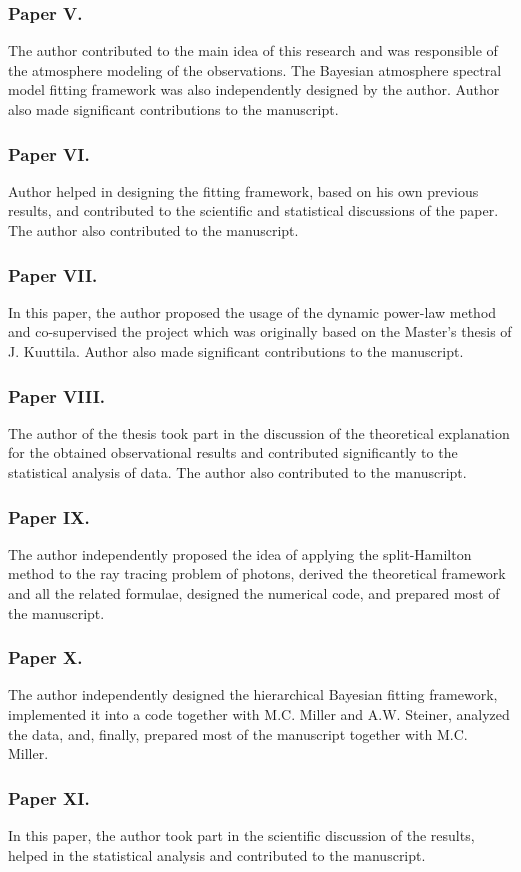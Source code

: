 \subsubsection*{Paper V.}
The author contributed to the main idea of this research and was responsible of the atmosphere modeling of the observations. The Bayesian atmosphere spectral model fitting framework was also independently designed by the author. 
Author also made significant contributions to the manuscript.


\subsubsection*{Paper VI.}
Author helped in designing the fitting framework, based on his own previous results, and contributed to the scientific and statistical discussions of the paper. 
The author also contributed to the manuscript.


\subsubsection*{Paper VII.}
In this paper, the author proposed the usage of the dynamic power-law method and co-supervised the project which was originally based on the Master's thesis of J. Kuuttila. 
Author also made significant contributions to the manuscript.


\subsubsection*{Paper VIII.}
The author of the thesis took part in the discussion of the theoretical explanation for the obtained observational results and contributed significantly to the statistical analysis of data. 
The author also contributed to the manuscript.


\subsubsection*{Paper IX.}
The author independently proposed the idea of applying the split-Hamilton method to the ray tracing problem of photons, derived the theoretical framework and all the related formulae, designed the numerical code, and prepared most of the manuscript.


\subsubsection*{Paper X.}
The author independently designed the hierarchical Bayesian fitting framework, implemented it into a code together with M.C. Miller and A.W. Steiner, analyzed the data, and, finally, prepared most of the manuscript together with M.C. Miller.


\subsubsection*{Paper XI.}
In this paper, the author took part in the scientific discussion of the results, helped in the statistical analysis and contributed to the manuscript.




